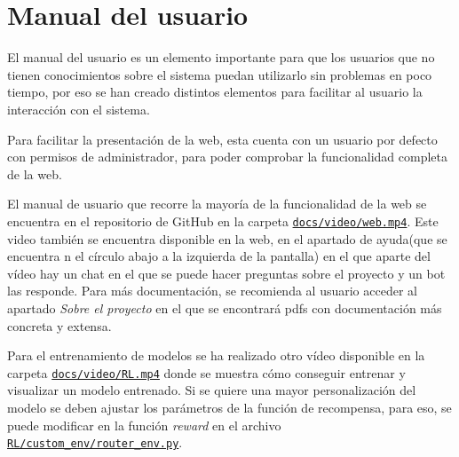 \section{Manual del usuario}
El manual del usuario es un elemento importante para que los usuarios que no tienen conocimientos sobre el sistema puedan utilizarlo sin problemas en poco tiempo, por eso se han creado distintos elementos para facilitar al usuario la interacción con el sistema.

Para facilitar la presentación de la web, esta cuenta con un usuario por defecto con permisos de administrador, para poder comprobar la funcionalidad completa de la web.

El manual de usuario que recorre la mayoría de la funcionalidad de la web se encuentra en el repositorio de GitHub en la carpeta \href{https://github.com/CesarRodrigu/GII-24.19-contramedidas-IoT-mediante-reinforcement-learning/tree/main/docs/video/web.mp4}{\texttt{docs/video/web.mp4}}.
Este video también se encuentra disponible en la web, en el apartado de ayuda(que se encuentra n el círculo abajo a la izquierda de la pantalla) en el que aparte del vídeo hay un chat en el que se puede hacer preguntas sobre el proyecto y un bot las responde. 
Para más documentación, se recomienda al usuario acceder al apartado \textit{Sobre el proyecto} en el que se encontrará pdfs con documentación más concreta y extensa.

Para el entrenamiento de modelos se ha realizado otro vídeo disponible en la carpeta \href{https://github.com/CesarRodrigu/GII-24.19-contramedidas-IoT-mediante-reinforcement-learning/tree/main/docs/video/RL.mp4}{\texttt{docs/video/RL.mp4}} donde se muestra cómo conseguir entrenar y visualizar un modelo entrenado. Si se quiere una mayor personalización del modelo se deben ajustar los parámetros de la función de recompensa, para eso, se puede modificar en la función \textit{reward} en el archivo \href{https://github.com/CesarRodrigu/GII-24.19-contramedidas-IoT-mediante-reinforcement-learning/blob/main/RL/custom_env/router_env.py}{\texttt{RL/custom\_env/router\_env.py}}.
